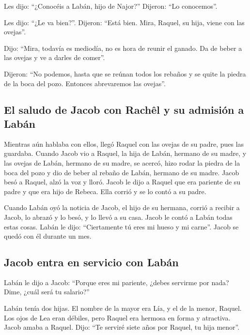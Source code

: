  Les dijo: ``¿Conocéis a Labán, hijo de Najor?'' Dijeron:
``Lo conocemos''.

 Les dijo: ``¿Le va bien?''. Dijeron: ``Está bien. Mira,
Raquel, su hija, viene con las ovejas''.

 Dijo: ``Mira, todavía es mediodía, no es hora de reunir
el ganado. Da de beber a las ovejas y ve a darles de comer''.

 Dijeron: ``No podemos, hasta que se reúnan todos los
rebaños y se quite la piedra de la boca del pozo. Entonces abrevaremos
las ovejas''.

\hypertarget{el-saludo-de-jacob-con-rachuxeal-y-su-admisiuxf3n-a-labuxe1n}{%
\subsection{El saludo de Jacob con Rachêl y su admisión a
Labán}\label{el-saludo-de-jacob-con-rachuxeal-y-su-admisiuxf3n-a-labuxe1n}}

 Mientras aún hablaba con ellos, llegó Raquel con las
ovejas de su padre, pues las guardaba.  Cuando Jacob vio
a Raquel, la hija de Labán, hermano de su madre, y las ovejas de Labán,
hermano de su madre, se acercó, hizo rodar la piedra de la boca del pozo
y dio de beber al rebaño de Labán, hermano de su madre. 
Jacob besó a Raquel, alzó la voz y lloró.  Jacob le dijo
a Raquel que era pariente de su padre y que era hijo de Rebeca. Ella
corrió y se lo contó a su padre.

 Cuando Labán oyó la noticia de Jacob, el hijo de su
hermana, corrió a recibir a Jacob, lo abrazó y lo besó, y lo llevó a su
casa. Jacob le contó a Labán todas estas cosas.  Labán le
dijo: ``Ciertamente tú eres mi hueso y mi carne''. Jacob se quedó con él
durante un mes.

\hypertarget{jacob-entra-en-servicio-con-labuxe1n}{%
\subsection{Jacob entra en servicio con
Labán}\label{jacob-entra-en-servicio-con-labuxe1n}}

 Labán le dijo a Jacob: ``Porque eres mi pariente, ¿debes
servirme por nada? Dime, ¿cuál será tu salario?''

 Labán tenía dos hijas. El nombre de la mayor era Lía, y
el de la menor, Raquel.  Los ojos de Lea eran débiles,
pero Raquel era hermosa en forma y atractiva.  Jacob
amaba a Raquel. Dijo: ``Te serviré siete años por Raquel, tu hija
menor''.

